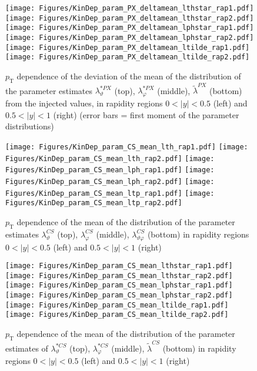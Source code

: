 \documentclass[12pt]{article}
\newcommand{\pT}{p_\mathrm{T}}
\newcommand{\absy}{\left |  y \right |}
\newcommand{\lamthCS}{\lambda^{\scriptscriptstyle CS}_\vartheta}
\newcommand{\lamphCS}{\lambda^{\scriptscriptstyle CS}_\varphi}
\newcommand{\lamthphCS}{\lambda^{\scriptscriptstyle CS}_{\vartheta \varphi}}
\newcommand{\lamtildeCS}{\tilde{\lambda}^{\scriptscriptstyle CS}}
\newcommand{\lamthstarCS}{\lambda^{* \scriptscriptstyle CS}_\vartheta}
\newcommand{\lamphstarCS}{\lambda^{* \scriptscriptstyle CS}_\varphi}
\newcommand{\lamtildePX}{\tilde{\lambda}^{\scriptscriptstyle PX}}
\newcommand{\lamthstarPX}{\lambda^{* \scriptscriptstyle PX}_\vartheta}
\newcommand{\lamphstarPX}{\lambda^{* \scriptscriptstyle PX}_\varphi}
\begin{document}
\begin{figure}[htbp]
\centering
\texttt{[image: Figures/KinDep\_param\_PX\_deltamean\_lthstar\_rap1.pdf]}
\texttt{[image: Figures/KinDep\_param\_PX\_deltamean\_lthstar\_rap2.pdf]}
\texttt{[image: Figures/KinDep\_param\_PX\_deltamean\_lphstar\_rap1.pdf]}
\texttt{[image: Figures/KinDep\_param\_PX\_deltamean\_lphstar\_rap2.pdf]}
\texttt{[image: Figures/KinDep\_param\_PX\_deltamean\_ltilde\_rap1.pdf]}
\texttt{[image: Figures/KinDep\_param\_PX\_deltamean\_ltilde\_rap2.pdf]}
\caption{$\pT$ dependence of the deviation of the mean of the distribution of
the parameter estimates $\lamthstarPX$ (top), $\lamphstarPX$ (middle),
$\lamtildePX$ (bottom) from the injected values, in rapidity regions
$0<\absy<0.5$ (left) and $0.5<\absy<1$ (right) (error bars = first moment of
the parameter distributions)}
\end{figure}
\clearpage










\begin{figure}[htbp]
\centering
\texttt{[image: Figures/KinDep\_param\_CS\_mean\_lth\_rap1.pdf]}
\texttt{[image: Figures/KinDep\_param\_CS\_mean\_lth\_rap2.pdf]}
\texttt{[image: Figures/KinDep\_param\_CS\_mean\_lph\_rap1.pdf]}
\texttt{[image: Figures/KinDep\_param\_CS\_mean\_lph\_rap2.pdf]}
\texttt{[image: Figures/KinDep\_param\_CS\_mean\_ltp\_rap1.pdf]}
\texttt{[image: Figures/KinDep\_param\_CS\_mean\_ltp\_rap2.pdf]}
\caption{$\pT$ dependence of the mean of the distribution of the parameter estimates $\lamthCS$ (top), $\lamphCS$ (middle), $\lamthphCS$ (bottom) in rapidity regions $0<\absy<0.5$ (left) and $0.5<\absy<1$ (right)}
\end{figure}
\clearpage

\begin{figure}[htbp]
\centering
\texttt{[image: Figures/KinDep\_param\_CS\_mean\_lthstar\_rap1.pdf]}
\texttt{[image: Figures/KinDep\_param\_CS\_mean\_lthstar\_rap2.pdf]}
\texttt{[image: Figures/KinDep\_param\_CS\_mean\_lphstar\_rap1.pdf]}
\texttt{[image: Figures/KinDep\_param\_CS\_mean\_lphstar\_rap2.pdf]}
\texttt{[image: Figures/KinDep\_param\_CS\_mean\_ltilde\_rap1.pdf]}
\texttt{[image: Figures/KinDep\_param\_CS\_mean\_ltilde\_rap2.pdf]}
\caption{$\pT$ dependence of the mean of the distribution of the parameter estimates of $\lamthstarCS$ (top), $\lamphstarCS$ (middle), $\lamtildeCS$ (bottom) in rapidity regions $0<\absy<0.5$ (left) and $0.5<\absy<1$ (right)}
\end{figure}
\clearpage
\end{document}
